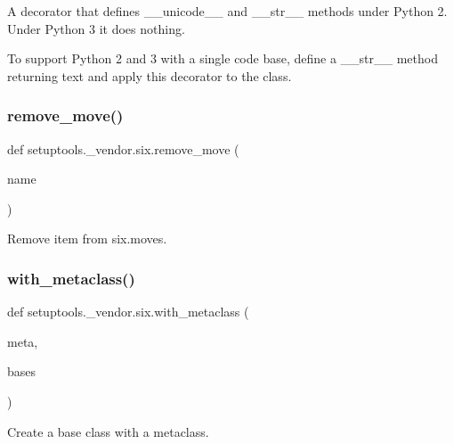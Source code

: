 \begin{DoxyVerb}A decorator that defines __unicode__ and __str__ methods under Python 2.
Under Python 3 it does nothing.

To support Python 2 and 3 with a single code base, define a __str__ method
returning text and apply this decorator to the class.
\end{DoxyVerb}
 \mbox{\label{namespacesetuptools_1_1__vendor_1_1six_a8663229c8c34107ebb6738573e5d5c5e}} 
\subsubsection{\texorpdfstring{remove\+\_\+move()}{remove\_move()}}
{\footnotesize\ttfamily def setuptools.\+\_\+vendor.\+six.\+remove\+\_\+move (\begin{DoxyParamCaption}\item[{}]{name }\end{DoxyParamCaption})}

\begin{DoxyVerb}Remove item from six.moves.\end{DoxyVerb}
 \mbox{\label{namespacesetuptools_1_1__vendor_1_1six_ac0b0cdce288b7fa644dd1685820b7ad1}} 
\subsubsection{\texorpdfstring{with\+\_\+metaclass()}{with\_metaclass()}}
{\footnotesize\ttfamily def setuptools.\+\_\+vendor.\+six.\+with\+\_\+metaclass (\begin{DoxyParamCaption}\item[{}]{meta,  }\item[{}]{bases }\end{DoxyParamCaption})}

\begin{DoxyVerb}Create a base class with a metaclass.\end{DoxyVerb}
 